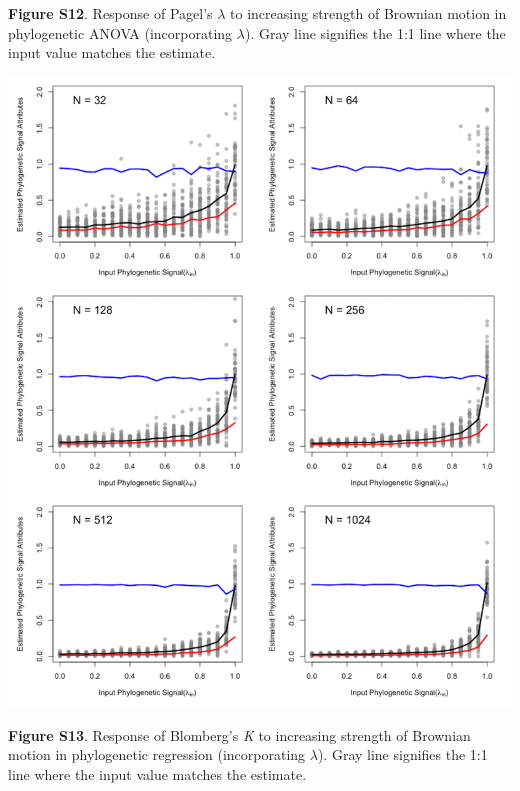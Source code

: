 \documentclass[
]{article}
\begin{document}
\textbf{Figure S12}. Response of Pagel's \(\lambda\) to increasing
strength of Brownian motion in phylogenetic ANOVA (incorporating
\(\lambda\)). Gray line signifies the 1:1 line where the input value
matches the estimate.

\includegraphics[width=0.95\linewidth]{fig.S13}

\textbf{Figure S13}. Response of Blomberg's \textit{K} to increasing
strength of Brownian motion in phylogenetic regression (incorporating
\(\lambda\)). Gray line signifies the 1:1 line where the input value
matches the estimate.
\end{document}
